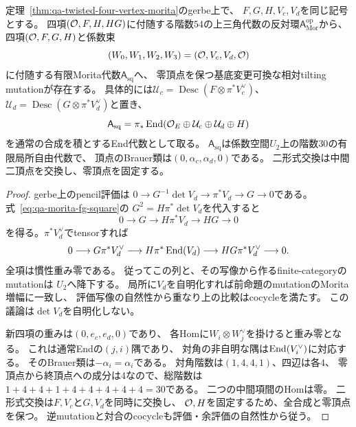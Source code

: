 \begin{proposition}[determinantを保つ五十四次元表示から三十次元表示へのmutation]
\label{prop:qa-symmetric-morita-rank30-mutation}
定理~\ref{thm:qa-twisted-four-vertex-morita}のgerbe上で、
$F,G,H,V_c,V_d$を同じ記号とする。
四項$(\mathcal O,F,H,HG)$に付随する階数$54$の上三角代数の反対環$\mathsf A_{\mathrm{Mor}}^{\mathrm{op}}$から、
四項$(\mathcal O,F,G,H)$と係数束
\[
 (W_0,W_1,W_2,W_3)=(\mathcal O,V_c,V_d,\mathcal O)
\]
に付随する有限Morita代数$\mathsf A_{\mathrm{sq}}$へ、
零頂点を保つ基底変更可換な相対tilting mutationが存在する。
具体的には$\mathcal U_c=\operatorname{Desc}(F\otimes\pi^*V_c^\vee)$、
$\mathcal U_d=\operatorname{Desc}(G\otimes\pi^*V_d^\vee)$と置き、
\[
 \mathsf A_{\mathrm{sq}}
 =\pi_*\operatorname{End}(\mathcal O_E\oplus\mathcal U_c\oplus\mathcal U_d\oplus H)
\]
を通常の合成を積とするEnd代数として取る。
$\mathsf A_{\mathrm{sq}}$は係数空間$U_2$上の階数$30$の有限局所自由代数で、
頂点のBrauer類は$(0,\alpha_c,\alpha_d,0)$である。
二形式交換は中間二頂点を交換し、零頂点を固定する。
\end{proposition}
\begin{proof}
gerbe上のpencil評価は
$0\to G^{-1}\det V_d\to\pi^*V_d\to G\to0$である。
式~\eqref{eq:qa-morita-fg-square}の
$G^2=H\pi^*\det V_d$を代入すると
\begin{equation}
 0\longrightarrow G\longrightarrow H\pi^*V_d
 \longrightarrow HG\longrightarrow0
 \label{eq:qa-symmetric-gerbe-evaluation}
\end{equation}
を得る。$\pi^*V_d^\vee$でtensorすれば
\begin{equation}
 0\longrightarrow G\pi^*V_d^\vee
 \longrightarrow H\pi^*\operatorname{End}(V_d)
 \longrightarrow HG\pi^*V_d^\vee\longrightarrow0.
 \label{eq:qa-symmetric-amplified-evaluation}
\end{equation}
全項は慣性重み零である。
従ってこの列と、その写像から作るfinite-categoryのmutationは
$U_2$へ降下する。
局所に$V_d$を自明化すれば前命題のmutationのMorita増幅に一致し、
評価写像の自然性から重なり上の比較はcocycleを満たす。
この議論は$\det V_d$を自明化しない。

新四項の重みは$(0,e_c,e_d,0)$であり、
各Homに$W_i\otimes W_j^\vee$を掛けると重み零となる。
これは通常Endの$(j,i)$隅であり、
対角の非自明な隅は$\operatorname{End}(V_i^\vee)$に対応する。
そのBrauer類は$-\alpha_i=\alpha_i$である。
対角階数は$(1,4,4,1)$、四辺は各$4$、
零頂点から終頂点への成分は$4$なので、総階数は
$1+4+4+1+4+4+4+4+4=30$である。
二つの中間項間のHomは零。
二形式交換は$F,V_c$と$G,V_d$を同時に交換し、
$\mathcal O,H$を固定するため、全合成と零頂点を保つ。
逆mutationと対合のcocycleも評価・余評価の自然性から従う。
\end{proof}

